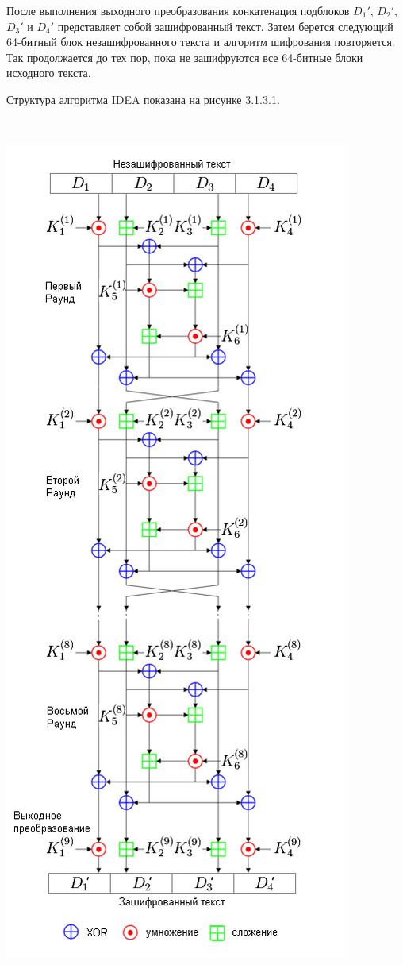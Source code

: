 \documentclass[a4paper]{report}
\begin{document}
После выполнения выходного преобразования конкатенация подблоков $D_{1}'$, $D_{2}'$, $D_{3}'$ и $D_{4}'$ представляет собой зашифрованный текст. Затем берется следующий 64-битный блок незашифрованного текста и алгоритм шифрования повторяется. Так продолжается до тех пор, пока не зашифруются все 64-битные блоки исходного текста.

Структура алгоритма IDEA показана на рисунке 3.1.3.1.

~

\includegraphics[scale=0.7]{IDEA_encryption}
{\\}
\end{document}
